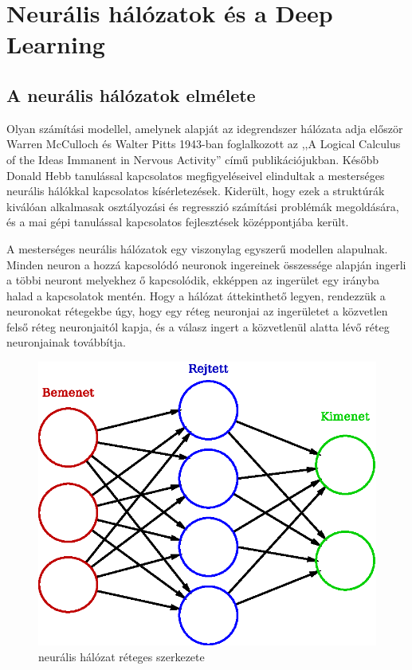 \chapter{Neurális hálózatok és a Deep Learning}\label{chap:neuralis-halozatok-es-a-deep-learning}

\section{A neurális hálózatok elmélete}
\label{sect:neuralNetworkTheory}
Olyan számítási modellel, amelynek alapját az idegrendszer hálózata adja először  Warren McCulloch és Walter Pitts 1943-ban foglalkozott az ,,A Logical Calculus of the Ideas Immanent in Nervous Activity'' című publikációjukban. Később Donald Hebb tanulással kapcsolatos megfigyeléseivel elindultak a mesterséges neurális hálókkal kapcsolatos kísérletezések.\cite{neural2006}
Kiderült, hogy ezek a struktúrák kiválóan alkalmasak osztályozási és regresszió számítási problémák megoldására, és a mai gépi tanulással kapcsolatos fejlesztések középpontjába került.

A mesterséges neurális hálózatok egy viszonylag egyszerű modellen alapulnak. Minden neuron a hozzá kapcsolódó neuronok ingereinek összessége alapján ingerli a többi neuront melyekhez ő kapcsolódik, ekképpen az ingerület egy irányba halad a kapcsolatok mentén. Hogy a hálózat áttekinthető legyen, rendezzük a neuronokat rétegekbe úgy, hogy egy réteg neuronjai az ingerületet a közvetlen felső réteg neuronjaitól kapja, és a válasz ingert a közvetlenül alatta lévő réteg neuronjainak továbbítja.

\begin{figure}[h]
	\centering
	\includegraphics[width=0.3\columnwidth]{fig/neural_network}
	\caption{neurális hálózat réteges szerkezete \protect \footnotemark}
	\label{fig:neuralNet}
\end{figure}

